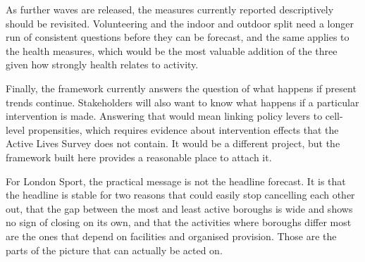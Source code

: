 \documentclass[ %
                    author={Ashrey Ashrey, Sanya Kapoor, Trisha Sharma, Yash Bhooshan Pandloskar},
                supervisor={Dr. Dalila O’Grady},
                    degree={MSc},
                     title={Using machine learning to forecast physical activity participation, volunteering and activity patterns in London},
                  subtitle={},
                      type={},
                      year={2021}]{dissertation}
\begin{document}
As further waves are released, the measures currently reported descriptively should be revisited. Volunteering and the indoor and outdoor split need a longer run of consistent questions before they can be forecast, and the same applies to the health measures, which would be the most valuable addition of the three given how strongly health relates to activity.

Finally, the framework currently answers the question of what happens if present trends continue. Stakeholders will also want to know what happens if a particular intervention is made. Answering that would mean linking policy levers to cell-level propensities, which requires evidence about intervention effects that the Active Lives Survey does not contain. It would be a different project, but the framework built here provides a reasonable place to attach it.

For London Sport, the practical message is not the headline forecast. It is that the headline is stable for two reasons that could easily stop cancelling each other out, that the gap between the most and least active boroughs is wide and shows no sign of closing on its own, and that the activities where boroughs differ most are the ones that depend on facilities and organised provision. Those are the parts of the picture that can actually be acted on.





%
%

\backmatter




\end{document}
